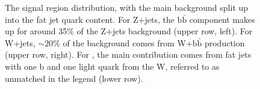 \begin{figure}
\caption{The signal region distribution, with the main background split up into the fat jet quark content. For Z+jets, the $\text{b}\bar{\text{b}}$ component makes up for around 35\% of the Z+jets background (upper row, left). For W+jets, $\sim20$\% of the background comes from W+$\text{b}\bar{\text{b}}$ production (upper row, right). For \ttbar, the main contribution comes from fat jets with one b and one light quark from the W, referred to as unmatched in the legend (lower row).}
\label{Fig_sr_content}
\end{figure}

\begin{figure}
\centering
  \\

\end{figure}
